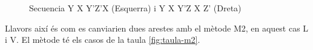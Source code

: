 \begin{figure}[h!]
    \centering
    \begin{subfigure}
        \centering\RubikCubeSolvedWY
    \end{subfigure}
    \begin{subfigure}
        \centering\RubikCubeSolvedWY
    \end{subfigure}
    \caption{Secuencia Y X Y'Z'X (Esquerra) i Y X Y'Z X Z' (Dreta)}
\end{figure}

Llavors així és com es canviarien dues arestes amb el mètode M2, en aquest cas L i V. El mètode té els casos de la taula \ref{fig:taula-m2}.

